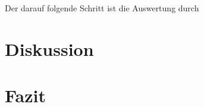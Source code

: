 \documentclass[
german,
]{bachelor}
\begin{document}
Der darauf folgende Schritt ist die Auswertung durch



\section{Diskussion}

\section{Fazit}

\appendix

\printunsrtglossaries
\end{document}
